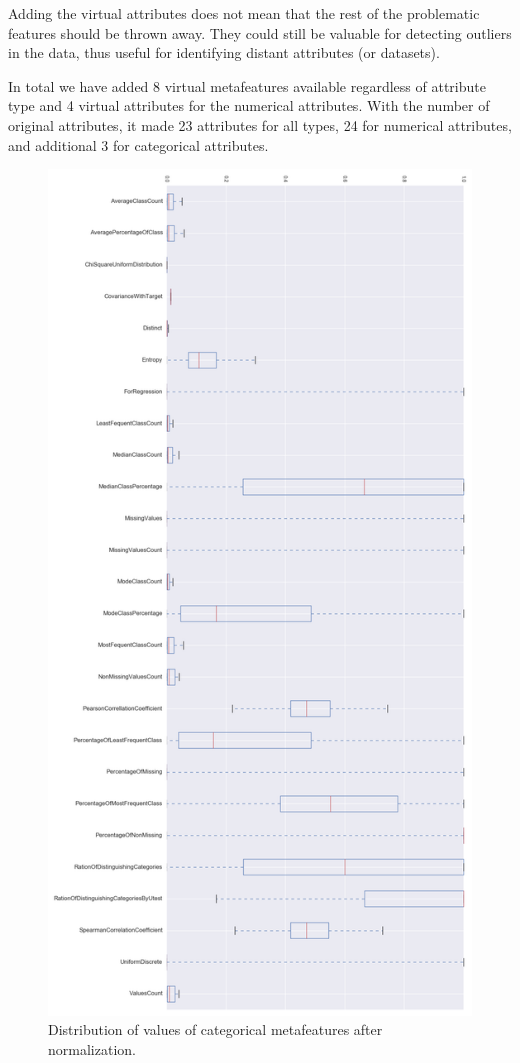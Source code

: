 Adding the virtual attributes does not mean that the rest of the problematic features should be thrown away. They could still be valuable for detecting outliers in the data, thus useful for identifying distant attributes (or datasets).

In total we have added 8 virtual metafeatures available regardless of attribute type and 4 virtual attributes for the numerical attributes. With the number of original attributes, it made 23 attributes for all types, 24 for numerical attributes, and additional 3 for categorical attributes.

\begin{figure}
	\includegraphics[width=12cm]{Images/categoricalAttributeDistribution.png}
	\centering
	\caption{Distribution of values of categorical metafeatures after normalization.}
	\label{fig:categoricalAttributeDistribution}	
\end{figure}

